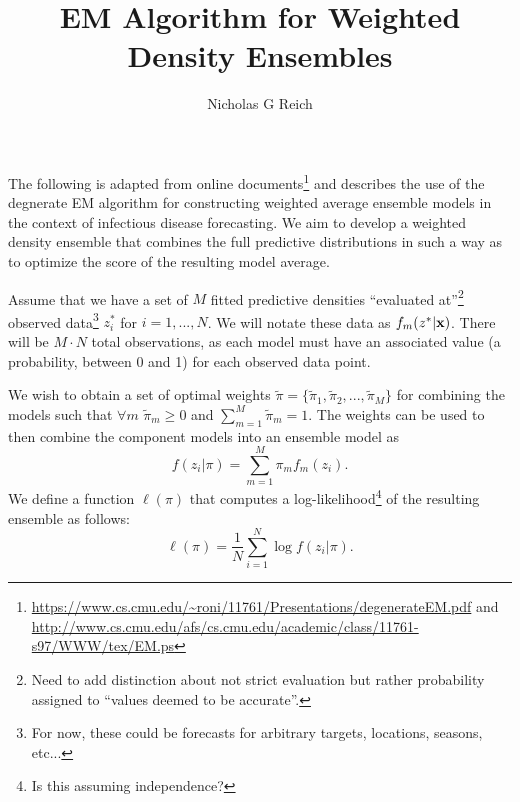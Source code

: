 \documentclass{article}
\title{EM Algorithm for Weighted Density Ensembles}
\author{Nicholas G Reich}
\begin{document}
\maketitle

The following is adapted from online documents\footnote{\url{https://www.cs.cmu.edu/~roni/11761/Presentations/degenerateEM.pdf} and \url{http://www.cs.cmu.edu/afs/cs.cmu.edu/academic/class/11761-s97/WWW/tex/EM.ps}} and describes the use of the degnerate EM algorithm for constructing weighted average ensemble models in the context of infectious disease forecasting.  
We aim to develop a weighted density ensemble that combines the full predictive distributions in such a way as to optimize the score of the resulting model average.

Assume that we have a set of $M$ fitted predictive densities ``evaluated at''\footnote{Need to add distinction about not strict evaluation but rather probability assigned to ``values deemed to be accurate''.} observed data\footnote{For now, these could be forecasts for arbitrary targets, locations, seasons, etc... } $z_i^*$ for $i=1, ..., N$. We will notate these data as  $f_{m}(z^*|{\bf x})$. There will be $M\cdot N$ total observations, as each model must have an associated value (a probability, between 0 and 1) for each observed data point.

We wish to obtain a set of optimal weights $\tilde\pi = \{\tilde\pi_1, \tilde\pi_2, ..., \tilde\pi_M\}$ for combining the models such that $\forall m$ $\tilde\pi_m \geq 0$ and $\sum_{m=1}^M \tilde\pi_m=1$.
The weights can be used to then combine the component models into an ensemble model as
$$f(z_i|\pi) = \sum_{m=1}^M \pi_m f_m(z_i).$$
We define a function $\ell(\pi)$ that computes a log-likelihood\footnote{Is this assuming independence?} of the resulting ensemble as follows:
$$\ell(\pi) = \frac{1}{N}\sum_{i=1}^N \log f(z_i|\pi).$$
\end{document}
